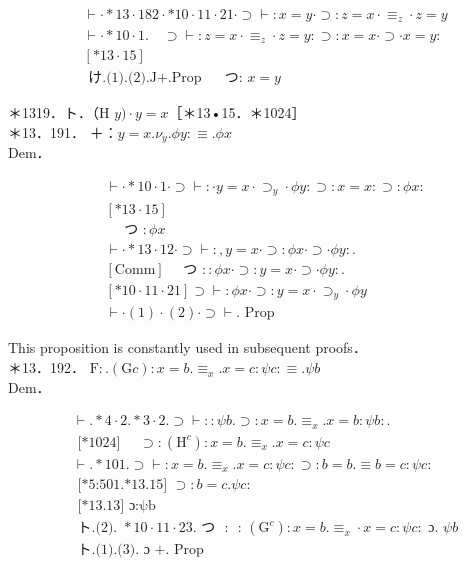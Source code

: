 \documentclass[10pt]{article}
\begin{document}
\begin{align*}
& \vdash \cdot * 13 \cdot 182 \cdot * 10 \cdot 11 \cdot 21 \cdot \supset \vdash: x=y \cdot \supset: z=x \cdot \equiv_{z} \cdot z=y  \tag{1}\\
& \vdash \cdot * 10 \cdot 1 . \quad \supset \vdash: z=x \cdot \equiv_{z} \cdot z=y: \supset: x=x \cdot \supset \cdot x=y: \\
& {[* 13 \cdot 15]}  \tag{2}\\
& \text { け.(1).(2).J+.Prop } \quad \text { つ: } x=y
\end{align*}


＊1319．ト．（H $y) \cdot y=x$［＊13•15．＊1024］\\
＊13．191． ＋：$y=x . \nu_{y} . \phi y: \equiv . \phi x$\\
Dem．


\begin{align*}
& \vdash \cdot * 10 \cdot 1 \cdot \supset \vdash: \cdot y=x \cdot \supset_{y} \cdot \phi y: \supset: x=x: \supset: \phi x: \\
& {[* 13 \cdot 15]}  \tag{1}\\
& \quad \text { つ }: \phi x \\
& \vdash \cdot * 13 \cdot 12 \cdot \supset \vdash:, y=x \cdot \supset: \phi x \cdot \supset \cdot \phi y: . \\
& {[\mathrm{Comm}] \quad \text { つ }:: \phi x \cdot \supset: y=x \cdot \supset \cdot \phi y: .}  \tag{2}\\
& {[* 10 \cdot 11 \cdot 21] \supset \vdash: \phi x \cdot \supset: y=x \cdot \supset_{y} \cdot \phi y} \\
& \vdash \cdot(1) \cdot(2) \cdot \supset \vdash . \text { Prop }
\end{align*}


This proposition is constantly used in subsequent proofs．\\
＊13．192． $\mathrm{F}: .(\mathrm{G} c): x=b . \equiv_{x} . x=c: \psi c: \equiv . \psi b$\\
Dem．


\begin{align*}
& \vdash . * 4 \cdot 2 . * 3 \cdot 2 . \supset \vdash:: \psi b . \supset: x=b . \equiv_{x} . x=b: \psi b: . \\
& \text { [*1024] } \quad \supset:\left(\mathrm{H}^{c}\right): x=b . \equiv_{x} . x=c: \psi c  \tag{1}\\
& \vdash . * 101 . \supset \vdash: x=b . \equiv_{x} . x=c: \psi c: \supset: b=b . \equiv b=c: \psi c: \\
& \text { [*5:501.*13.15] } \supset: b=c . \psi c: \\
& \text { [*13.13] ɔ:ψb }  \tag{2}\\
& \text { ト.(2). } * 10 \cdot 11 \cdot 23 . \text { つ } \text { : } \text { : }\left(\mathrm{G}^{c}\right): x=b . \equiv_{x} \cdot x=c: \psi c: \text { ɔ. } \psi b  \tag{3}\\
& \text { ト.(1).(3). ɔ }+ \text {. Prop }
\end{align*}
\end{document}
